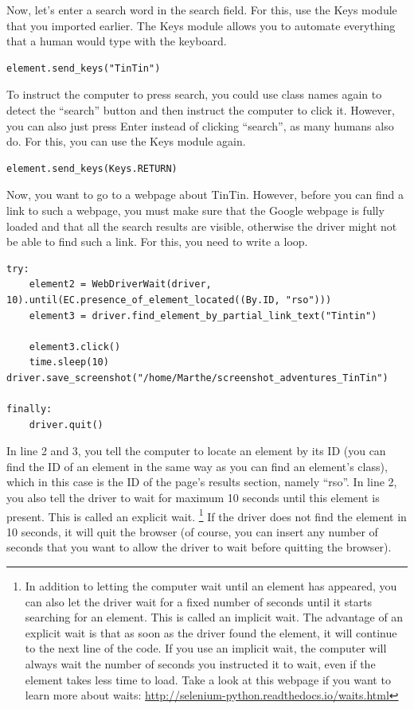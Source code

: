 \documentclass[a4paper,12pt]{book}
\begin{document}
\begin{appendices}
Now, let’s enter a search word in the search field. For this, use the Keys module that you imported earlier. The Keys module allows you to automate everything that a human would type with the keyboard. 

\begin{lstlisting}
element.send_keys("TinTin")
\end{lstlisting}

To instruct the computer to press search, you could use class names again to detect the ``search'' button and then instruct the computer to click it. However, you can also just press Enter instead of clicking ``search'', as many humans also do. For this, you can use the Keys module again. 

\begin{lstlisting}
element.send_keys(Keys.RETURN)
\end{lstlisting}

Now, you want to go to a webpage about TinTin. However, before you can find a link to such a webpage, you must make sure that the Google webpage is fully loaded and that all the search results are visible, otherwise the driver might not be able to find such a link. For this, you need to write a loop.

\begin{lstlisting}
try:
    element2 = WebDriverWait(driver, 10).until(EC.presence_of_element_located((By.ID, "rso")))
    element3 = driver.find_element_by_partial_link_text("Tintin")

    element3.click()
    time.sleep(10)	driver.save_screenshot("/home/Marthe/screenshot_adventures_TinTin")

finally:
    driver.quit()
\end{lstlisting} 


In line 2 and 3, you tell the computer to locate an element by its ID (you can find the ID of an element in the same way as you can find an element’s class), which in this case is the ID of the page’s results section, namely ``rso''. In line 2, you also tell the driver to wait for maximum 10 seconds until this element is present. This is called an explicit wait.
\footnote{In addition to letting the computer wait until an element has appeared, you can also let the driver wait for a fixed number of seconds until it starts searching for an element. This is called an implicit wait. The advantage of an explicit wait is that as soon as the driver found the element, it will continue to the next line of the code. If you use an implicit wait, the computer will always wait the number of seconds you instructed it to wait, even if the element takes less time to load. Take a look at this webpage if you want to learn more about waits: \url{http://selenium-python.readthedocs.io/waits.html}}
If the driver does not find the element in 10 seconds, it will quit the browser (of course, you can insert any number of seconds that you want to allow the driver to wait before quitting the browser).  



\end{appendices}
\end{document}
